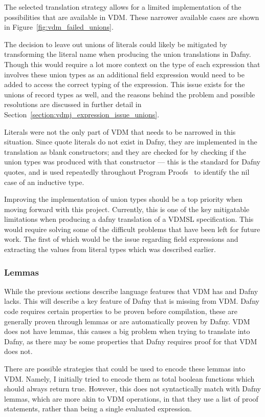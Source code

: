 \documentclass{entcs}
\begin{document}
The selected translation strategy allows for a limited implementation of the possibilities that are available in VDM. These narrower available cases are shown in Figure~\ref{fig:vdm_failed_unions}. 

The decision to leave out unions of literals could likely be mitigated by transforming the literal name when producing the union translations in Dafny. Though this would require a lot more context on the type of each expression that involves these union types as an additional field expression would need to be added to access the correct typing of the expression. This issue exists for the unions of record types as well, and the reasons behind the problem and possible resolutions are discussed in further detail in Section~\ref{section:vdmj_expression_issue_unions}.

Literals were not the only part of VDM that needs to be narrowed in this situation. Since quote literals do not exist in Dafny, they are implemented in the translation as blank constructors; and they are checked for by checking if the union types was produced with that constructor --- this is the standard for Dafny quotes, and is used repeatedly throughout Program Proofs~\cite{ProgramProofs} to identify the nil case of an inductive type.

Improving the implementation of union types should be a top priority when moving forward with this project. Currently, this is one of the key mitigatable limitations when producing a dafny translation of a VDMSL specification. This would require solving some of the difficult problems that have been left for future work. The first of which would be the issue regarding field expressions and extracting the values from literal types which was described earlier.

\subsubsection{Lemmas}\label{section:pog}

While the previous sections describe language features that VDM has and Dafny lacks. This will describe a key feature of Dafny that is missing from VDM. Dafny code requires certain properties to be proven before compilation, these are generally proven through lemmas or are automatically proven by Dafny. VDM does not have lemmas, this causes a big problem when trying to translate into Dafny, as there may be some properties that Dafny requires proof for that VDM does not. 

There are possible strategies that could be used to encode these lemmas into VDM. Namely, I initially tried to encode them as total boolean functions which should always return true. However, this does not syntactically match with Dafny lemmas, which are more akin to VDM operations, in that they use a list of proof statements, rather than being a single evaluated expression. 
\end{document}
